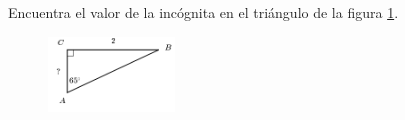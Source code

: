 Encuentra el valor de la incógnita en el triángulo de la figura \ref{fig:lados_functrig_26}.
\begin{figure}[H]
    \begin{center}
        \includegraphics[width=0.3\textwidth]{../images/lados_functrig_26.png}
    \end{center}
    \caption{}
    \label{fig:lados_functrig_26}
\end{figure}